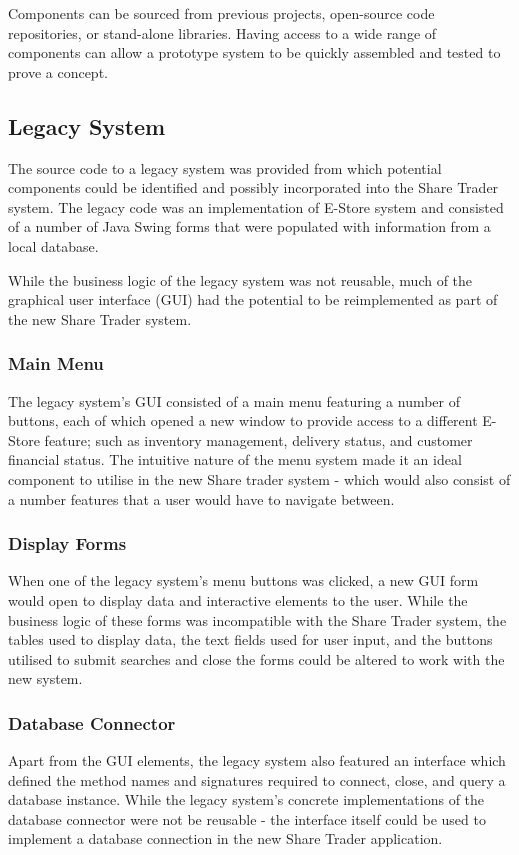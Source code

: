 \documentclass[12pt, a4paper,titlepage]{article}
\begin{document}
Components can be sourced from previous projects, open-source code
repositories, or stand-alone libraries. 
Having access to a wide range of components can allow a prototype system to be
quickly assembled and tested to prove a concept.

\subsection{Legacy System}
The source code to a legacy system was provided from which potential
components could be identified and possibly incorporated into the Share Trader
system.  
The legacy code was an implementation of E-Store system and consisted of a
number of Java Swing forms that were populated with information from a local
database.

While the business logic of the legacy system was not reusable, much of the
graphical user interface (GUI) had the potential to be reimplemented as part of
the new Share Trader system.

\subsubsection{Main Menu}
The legacy system’s GUI consisted of a main menu featuring a number of
buttons, each of which opened a new window to provide access to a different
E-Store feature; such as inventory management, delivery status, and customer
financial status.  
The intuitive nature of the menu system made it an ideal component to utilise
in the new Share trader system - which would also consist of a number features
that a user would have to navigate between.

\subsubsection{Display Forms}
When one of the legacy system’s menu buttons was clicked, a new GUI form would
open to display data and interactive elements to the user.  
While the business logic of these forms was incompatible with the Share
Trader system, the tables used to display data, the text fields used for user
input, and the buttons utilised to submit searches and close the forms could
be altered to work with the new system.

\subsubsection{Database Connector}
Apart from the GUI elements, the legacy system also featured an interface
which defined the method names and signatures required to connect, close, and
query a database instance. 
While the legacy system’s concrete implementations of the database connector
were not be reusable - the interface itself could be used to implement a 
database connection in the new Share Trader application.
\end{document}
